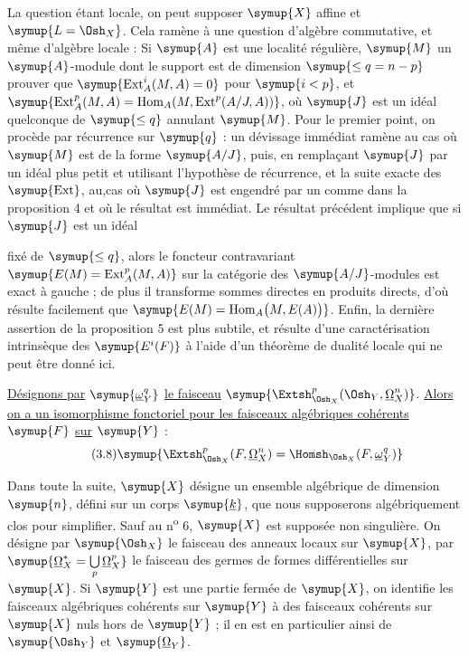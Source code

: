 La question étant locale, on peut supposer $\symup{X}$ affine et $\symup{L=\Osh_X}$. Cela ramène
à une question d'algèbre commutative, et même d'algèbre locale : Si $\symup{A}$ est une
localité régulière, $\symup{M}$ un $\symup{A}$-module dont le support est de dimension
$\symup{\leq q=n-p}$ prouver que $\symup{\operatorname{Ext}_{A}^{i}(M,A)=0}$ pour $\symup{i<p}$, et
$\symup{\operatorname{Ext}_{A}^{p}(M,A)
=\operatorname{Hom}_{A}\!\left(M,\operatorname{Ext}^{p}(A/J,A)\right)}$,
où $\symup{J}$ est un idéal quelconque de  $\symup{\leq q}$ annulant $\symup{M}$. Pour le
premier point, on procède par récurrence sur $\symup{q}$ : un dévissage immédiat ramène
au cas où $\symup{M}$ est de la forme $\symup{A/J}$, puis, en remplaçant $\symup{J}$ par un idéal plus
petit et utilisant l'hypothèse de récurrence, et la suite exacte des
$\symup{\operatorname{Ext}}$, au,cas où $\symup{J}$ est engendré par un 
comme dans la proposition 4 et où le résultat est immédiat. Le résultat
précédent implique que si $\symup{J}$ est un idéal

fixé de  $\symup{\leq q}$, alors le foncteur contravariant
$\symup{E(M)=\operatorname{Ext}_{A}^{p}(M,A)}$ sur la catégorie des $\symup{A/J}$-modules est
exact à gauche ; de plus il transforme sommes directes en produits directs,
d'où résulte facilement que
$\symup{E(M)=\operatorname{Hom}_{A}\bigl(M,E(A)\bigr)}$.
 Enfin, la
dernière assertion de la proposition 5 est plus subtile, et résulte d'une
caractérisation intrinsèque des $\symup{E^{i}(F)}$ à l'aide d'un théorème de dualité
locale qui ne peut être donné ici.

 \uline{Désignons par} $\symup{\underline{\omega}_Y^{q}}$ \uline{le faisceau}
$\symup{\Extsh_{\Osh_X}^{p}(\Osh_Y,\underline{\Omega}_X^{n})}$. \uline{Alors on a un isomorphisme
fonctoriel pour les faisceaux algébriques cohérents} $\symup{F}$ \uline{sur} $\symup{Y}$ :
\begin{equation}\tag{3.8}
  \symup{\Extsh_{\Osh_X}^{p}(F,\underline{\Omega}_X^{n})
  =\Homsh_{\Osh_X}(F,\underline{\omega}_Y^{q})}
\end{equation}


Dans toute la suite, $\symup{X}$ désigne un ensemble algébrique de dimension $\symup{n}$, défini
sur un corps $\symup{\underline{k}}$, que nous supposerons algébriquement clos pour simplifier. Sauf
au n\textsuperscript{o} 6, $\symup{X}$ est supposée non singulière. On désigne par
$\symup{\Osh_X}$ le faisceau des anneaux locaux sur $\symup{X}$, par
$\symup{\underline{\Omega}_X^{*}=\bigcup\limits_p\underline{\Omega}_X^{p}}$ le faisceau des germes de formes différentielles sur $\symup{X}$. Si $\symup{Y}$ est une partie fermée de $\symup{X}$, on identifie
les faisceaux algébriques cohérents sur $\symup{Y}$ à des faisceaux cohérents sur $\symup{X}$
nuls hors de $\symup{Y}$ ; il en est en particulier ainsi de $\symup{\Osh_Y}$ et $\symup{\underline{\Omega}_Y}$.

